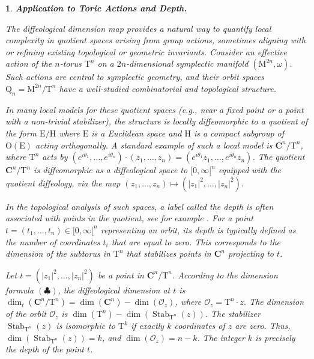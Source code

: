 \documentclass[10pt,reqno,letterpaper,twoside]{amsart}
\theoremstyle{article}
\newtheorem{article}{}
\def\artlabel[#1]{\textbf{#1.}}
\newcommand{\CC}{\mathbf{C}}
\newcommand{\cO}{{\mathcal O}}
\def \E{\mathrm E}
\def \H{\mathrm H}
\def \M{\mathrm M}
\def \O{\mathrm O}
\def \Q{\mathrm Q}
\def \T{\mathrm T}
\DeclareMathOperator{\Stab}{Stab}
\def \H{\mathrm H} %
\def \O{\mathrm O}
\begin{document}
  \begin{article}
    \artlabel[Application to Toric Actions and Depth]
    \label{Toric_Actions_and_Depth}
    
    The diffeological dimension map provides a natural way to quantify local complexity in quotient spaces arising from group actions,
    sometimes aligning with or refining existing topological or geometric invariants.
    Consider an effective action of the $n$-torus $\T^n$ on a $2n$-dimensional symplectic manifold $(\M^{2n}, \omega)$.
    Such actions are central to symplectic geometry,
    and their orbit spaces $\Q_n = \M^{2n}/\T^n$ have a well-studied combinatorial and topological structure.
    
    In many local models for these quotient spaces
    (e.g., near a fixed point or a point with a non-trivial stabilizer),
    the structure is locally diffeomorphic to a quotient of the form $\E/\H$ where $\E$ is a Euclidean space and $\H$ is a compact subgroup of $\O(\E)$ acting orthogonally.
    A standard example of such a local model is $\CC^n/\T^n$,
    where $\T^n$ acts by $(e^{i\theta_1}, \dots, e^{i\theta_n}) \cdot (z_1, \dots, z_n) = (e^{i\theta_1}z_1, \dots, e^{i\theta_n}z_n)$.
    The quotient $\CC^n/\T^n$ is diffeomorphic as a diffeological space to $[0,\infty[^n$ equipped with the quotient diffeology,
    via the map $(z_1, \dots, z_n) \mapsto (|z_1|^2, \dots, |z_n|^2)$.
    
    In the topological analysis of such spaces,
    a label called the \emph{depth} is often associated with points in the quotient,
    see for example \cite{KS}.
    For a point $t = (t_1, \dots, t_n) \in [0,\infty[^n$ representing an orbit,
    its depth is typically defined as the number of coordinates $t_i$ that are equal to zero.
    This corresponds to the dimension of the subtorus in $\T^n$ that stabilizes points in $\CC^n$ projecting to $t$.
    
    Let $t = (|z_1|^2, \dots, |z_n|^2)$ be a point in $\CC^n/\T^n$.
    According to the dimension formula $(\clubsuit)$,
    the diffeological dimension at $t$ is $\dim_t(\CC^n/\T^n) = \dim(\CC^n) - \dim(\cO_z)$,
    where $\cO_z = \T^n \cdot z$.
    The dimension of the orbit $\cO_z$ is $\dim(\T^n) - \dim(\Stab_{\T^n}(z))$.
    The stabilizer $\Stab_{\T^n}(z)$ is isomorphic to $\T^k$ if exactly $k$ coordinates of $z$ are zero.
    Thus,
    $\dim(\Stab_{\T^n}(z)) = k$,
    and $\dim(\cO_z) = n - k$.
    The integer $k$ is precisely the depth of the point $t$.
    

\end{article}
\end{document}
